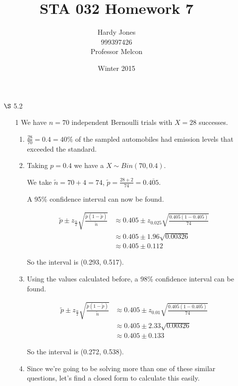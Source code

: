 \documentclass[12pt,letterpaper]{article}
\title{STA 032 Homework 7\vspace{-2ex}}
\author{Hardy Jones\\
        999397426\\
        Professor Melcon\vspace{-2ex}}
\date{Winter 2015}
\begin{document}
  \maketitle

  \begin{enumerate}
    \item [$\S$ 5.2]
      \begin{enumerate}
        \item [1]
          We have $n = 70$ independent Bernoulli trials with $X = 28$ successes.
          \begin{enumerate}[label=(\arabic*)]
            \item
              $\frac{28}{70} = 0.4 = 40\%$ of the sampled automobiles had emission levels that exceeded the standard.
            \item
              Taking $p = 0.4$ we have a $X \sim Bin(70, 0.4)$.

              We take $\tilde{n} = 70 + 4 = 74$,
              $\tilde{p} = \frac{28 + 2}{74} = 0.\overline{405}$.

              A 95\% confidence interval can now be found.

              \begin{align*}
                \tilde{p} \pm z_{\frac{\alpha}{2}} \sqrt{\frac{\tilde{p}(1 - \tilde{p})}{\tilde{n}}}
                &\approx 0.405 \pm z_{0.025} \sqrt{\frac{0.405(1 - 0.405)}{74}} \\
                &\approx 0.405 \pm 1.96 \sqrt{0.00326}\\
                &\approx 0.405 \pm 0.112
              \end{align*}

              So the interval is (0.293, 0.517).
            \item
              Using the values calculated before,
              a 98\% confidence interval can be found.

              \begin{align*}
                \tilde{p} \pm z_{\frac{\alpha}{2}} \sqrt{\frac{\tilde{p}(1 - \tilde{p})}{\tilde{n}}}
                &\approx 0.405 \pm z_{0.01} \sqrt{\frac{0.405(1 - 0.405)}{74}} \\
                &\approx 0.405 \pm 2.33 \sqrt{0.00326}\\
                &\approx 0.405 \pm 0.133
              \end{align*}

              So the interval is (0.272, 0.538).
            \item
              Since we're going to be solving more than one of these similar questions,
              let's find a closed form to calculate this easily.


\end{enumerate}
\end{enumerate}
\end{enumerate}
\end{document}
